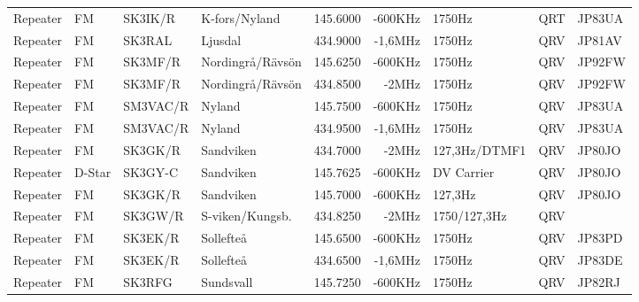 \begin{landscape}
\begin{longtable}{llllrrlcl}
	Repeater          & FM           & SK3IK/R       & K-fors/Nyland    &          145.6000 &        -600KHz & 1750Hz          &       QRT       & JP83UA           \\
	Repeater          & FM           & SK3RAL        & Ljusdal          &          434.9000 &        -1,6MHz & 1750Hz          &       QRV       & JP81AV           \\
	Repeater          & FM           & SK3MF/R       & Nordingrå/Rävsön &          145.6250 &        -600KHz & 1750Hz          &       QRV       & JP92FW           \\
	Repeater          & FM           & SK3MF/R       & Nordingrå/Rävsön &          434.8500 &          -2MHz & 1750Hz          &       QRV       & JP92FW           \\
	Repeater          & FM           & SM3VAC/R      & Nyland           &          145.7500 &        -600KHz & 1750Hz          &       QRV       & JP83UA           \\
	Repeater          & FM           & SM3VAC/R      & Nyland           &          434.9500 &        -1,6MHz & 1750Hz          &       QRV       & JP83UA           \\
	Repeater          & FM           & SK3GK/R       & Sandviken        &          434.7000 &          -2MHz & 127,3Hz/DTMF1   &       QRV       & JP80JO           \\
	Repeater          & D-Star       & SK3GY-C       & Sandviken        &          145.7625 &        -600KHz & DV Carrier      &       QRV       & JP80JO           \\
	Repeater          & FM           & SK3GK/R       & Sandviken        &          145.7000 &        -600KHz & 127,3Hz         &       QRV       & JP80JO           \\
	Repeater          & FM           & SK3GW/R       & S-viken/Kungsb.  &          434.8250 &          -2MHz & 1750/127,3Hz    &       QRV       &  \\
	Repeater          & FM           & SK3EK/R       & Sollefteå        &          145.6500 &        -600KHz & 1750Hz          &       QRV       & JP83PD           \\
	Repeater          & FM           & SK3EK/R       & Sollefteå        &          434.6500 &        -1,6MHz & 1750Hz          &       QRV       & JP83DE           \\
	Repeater          & FM           & SK3RFG        & Sundsvall        &          145.7250 &        -600KHz & 1750Hz          &       QRV       & JP82RJ           \\

\end{longtable}
\end{landscape}
